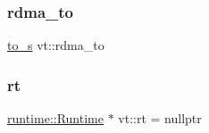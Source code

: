 \mbox{\label{namespacevt_a627aea388cdbf2818bf1393dca90938e}} 
\subsubsection{\texorpdfstring{rdma\+\_\+to}{rdma\_to}}
{\footnotesize\ttfamily \hyperlink{structvt_1_1to__s}{to\+\_\+s} vt\+::rdma\+\_\+to}

\mbox{\label{namespacevt_acce65ec10b513659274e722365aaa36d}} 
\subsubsection{\texorpdfstring{rt}{rt}}
{\footnotesize\ttfamily \hyperlink{structvt_1_1runtime_1_1_runtime}{runtime\+::\+Runtime} $\ast$ vt\+::rt = nullptr}

